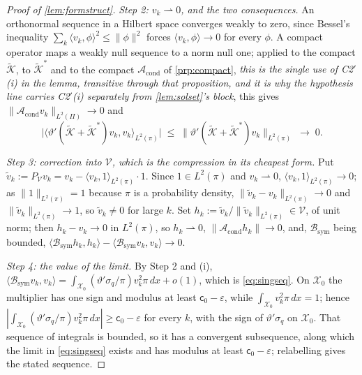 \begin{proof}[Proof of \cref{lem:formstruct}]
\emph{Step 2: $v_k\rightharpoonup0$, and the two consequences.} An orthonormal sequence in a Hilbert space
converges weakly to zero, since Bessel's inequality $\sum_k\langle v_k,\phi\rangle^{2}\le\|\phi\|^{2}$
forces $\langle v_k,\phi\rangle\to0$ for every $\phi$. A compact operator maps a weakly null sequence to a
norm null one; applied to the compact $\tilde{\mathcal K}$, to $\tilde{\mathcal K}^{\ast}$ and to the
compact $\mathcal A_{\mathrm{cond}}$ of \cref{prp:compact}, \emph{this is the single use of C2$'$(i) in
the lemma, transitive through that proposition, and it is why the hypothesis line carries C2$'$(i)
separately from \cref{lem:solset}'s block}, this gives
$\|\mathcal A_{\mathrm{cond}}v_k\|_{L^{2}(\Pi)}\to0$ and
\[
\big|\big\langle\vartheta'(\tilde{\mathcal K}+\tilde{\mathcal K}^{\ast})v_k,v_k\big\rangle_{L^{2}(\pi)}\big|
\;\le\;\big\|\vartheta'(\tilde{\mathcal K}+\tilde{\mathcal K}^{\ast})v_k\big\|_{L^{2}(\pi)}\;\longrightarrow\;0 .
\]

\emph{Step 3: correction into $\mathcal V$, which is the compression in its cheapest form.} Put
$\tilde v_k:=P_{\mathcal V}v_k=v_k-\langle v_k,1\rangle_{L^{2}(\pi)}\cdot1$. Since $1\in L^{2}(\pi)$ and
$v_k\rightharpoonup0$, $\langle v_k,1\rangle_{L^{2}(\pi)}\to0$; as $\|1\|_{L^{2}(\pi)}=1$ because $\pi$ is
a probability density, $\|\tilde v_k-v_k\|_{L^{2}(\pi)}\to0$ and $\|\tilde v_k\|_{L^{2}(\pi)}\to1$, so
$\tilde v_k\ne0$ for large $k$. Set $h_k:=\tilde v_k/\|\tilde v_k\|_{L^{2}(\pi)}\in\mathcal V$, of unit
norm; then $h_k-v_k\to0$ in $L^{2}(\pi)$, so $h_k\rightharpoonup0$,
$\|\mathcal A_{\mathrm{cond}}h_k\|\to0$, and, $\mathcal B_{\mathrm{sym}}$ being bounded,
$\langle\mathcal B_{\mathrm{sym}}h_k,h_k\rangle-\langle\mathcal B_{\mathrm{sym}}v_k,v_k\rangle\to0$.

\emph{Step 4: the value of the limit.} By Step 2 and (i),
$\langle\mathcal B_{\mathrm{sym}}v_k,v_k\rangle
=\int_{\mathcal X_0}(\vartheta'\sigma_q/\pi)v_k^{2}\pi\,dx+o(1)$, which is \eqref{eq:singseq}. On
$\mathcal X_0$ the multiplier has one sign and modulus at least $\mathsf c_0-\varepsilon$, while
$\int_{\mathcal X_0}v_k^{2}\pi\,dx=1$; hence
$|\int_{\mathcal X_0}(\vartheta'\sigma_q/\pi)v_k^{2}\pi\,dx|\ge\mathsf c_0-\varepsilon$ for every $k$,
with the sign of $\vartheta'\sigma_q$ on $\mathcal X_0$. That sequence of integrals is bounded, so it has
a convergent subsequence, along which the limit in \eqref{eq:singseq} exists and has modulus at least
$\mathsf c_0-\varepsilon$; relabelling gives the stated sequence.


\end{proof}
